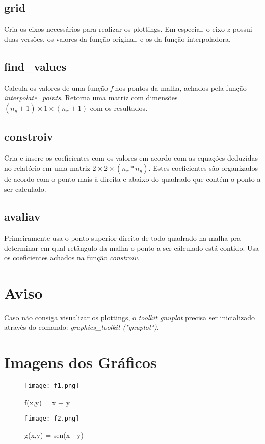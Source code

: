 \documentclass[a4paper, 12pt]{article}
\begin{document}
\subsection*{grid}
    Cria os eixos necessários para realizar os plottings. Em especial, o eixo $z$ possui duas versões, os valores da função original, e os da função interpoladora.

\subsection*{find\_values}
    Calcula os valores de uma função \textit{f} nos pontos da malha, achados pela função \textit{interpolate\_points}. Retorna uma matriz com dimensões $(n_y + 1) \times 1 \times (n_x + 1)$ com os resultados.
    
\subsection*{constroiv}
    Cria e insere os coeficientes com os valores em acordo com as equações deduzidas no relatório em uma matriz $2 \times 2 \times (n_x*n_y)$. Estes coeficientes são organizados de acordo com o ponto mais à direita e abaixo do quadrado que contém o ponto a ser calculado.
    
\subsection*{avaliav}
    Primeiramente usa o ponto superior direito de todo quadrado na malha pra determinar em qual retângulo da malha o ponto a ser cálculado está contido. Usa os coeficientes achados na função \textit{constroiv}.
    
\section*{Aviso}
    Caso não consiga visualizar os plottings, o \textit{toolkit gnuplot} precisa ser inicializado 
    através do comando: \textit{graphics\_toolkit ("gnuplot")}.
    
\section*{Imagens dos Gráficos}
\begin{figure}[!htp]
\centering
\texttt{[image: f1.png]}
\caption{f(x,y) = x + y}
\end{figure}

\begin{figure}[!htp]
\centering
\texttt{[image: f2.png]}
\caption{g(x,y) = sen(x - y)}
\end{figure}
\end{document}
